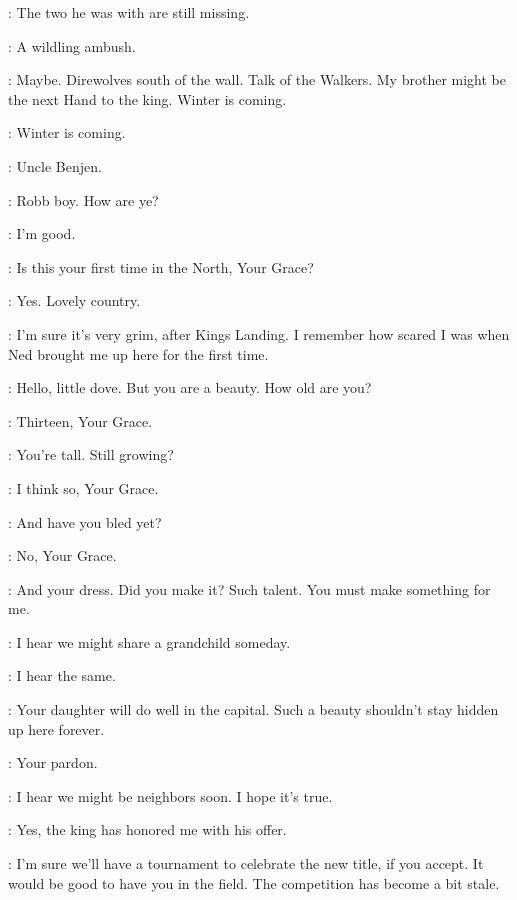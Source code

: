 \BENJEN: The two he was with are still missing. 

\NED: A wildling ambush. 

\BENJEN: Maybe. Direwolves south of the wall. Talk of the Walkers. My brother might be the next Hand to the king. Winter is coming. 

\NED: Winter is coming. 


\ROBB: Uncle Benjen. 

\BENJEN: Robb boy. How are ye? 

\ROBB: I'm good. 


\CATELYN: Is this your first time in the North, Your Grace? 

\CERSEI: Yes. Lovely country. 

\CATELYN: I'm sure it's very grim, after Kings Landing. I remember how scared I was when Ned brought me up here for the first time. 


\CERSEI: Hello, little dove. But you are a beauty. How old are you? 

\SANSA: Thirteen, Your Grace. 

\CERSEI: You're tall. Still growing? 

\SANSA: I think so, Your Grace. 

\CERSEI: And have you bled yet? 

\SANSA: No, Your Grace. 

\CERSEI: And your dress. Did you make it? Such talent. You must make something for me. 


\CERSEI: I hear we might share a grandchild someday. 

\CATELYN: I hear the same. 

\CERSEI: Your daughter will do well in the capital. Such a beauty shouldn't stay hidden up here forever. 


\NED: Your pardon. 

\JAIME: I hear we might be neighbors soon. I hope it's true. 

\NED: Yes, the king has honored me with his offer. 

\JAIME: I'm sure we'll have a tournament to celebrate the new title, if you accept. It would be good to have you in the field. The competition has become a bit stale. 

